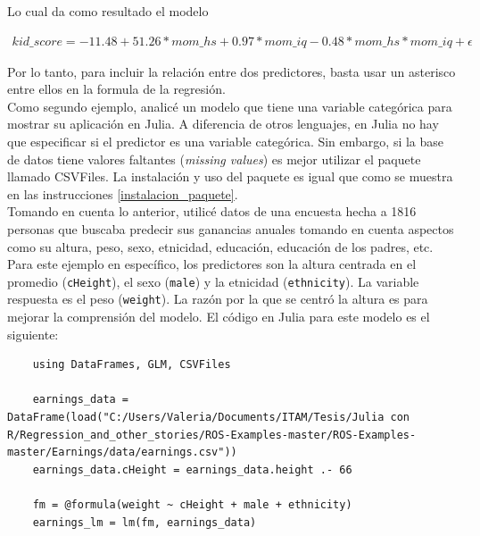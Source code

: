 Lo cual da como resultado el modelo 


\begin{equation*}
    \begin{aligned}
        kid\_score = -11.48 + 51.26* mom\_hs + 0.97*mom\_iq -0.48*mom\_hs*mom\_iq + \epsilon
    \end{aligned}
\end{equation*}

Por lo tanto, para incluir la relación entre dos predictores, basta usar un asterisco entre ellos en la formula de la regresión. 
\\
Como segundo ejemplo, analicé un modelo que tiene una variable categórica para mostrar su aplicación en Julia. A diferencia de otros lenguajes, en Julia no hay que especificar si el predictor es una variable categórica. Sin embargo, si la base de datos tiene valores faltantes (\textit{missing values}) es mejor utilizar el paquete llamado \textsf{CSVFiles}. La instalación y uso del paquete es igual que como se muestra en las instrucciones \ref{instalacion_paquete}.  
\\
Tomando en cuenta lo anterior, utilicé datos de una encuesta hecha a 1816 personas que buscaba predecir sus ganancias anuales tomando en cuenta aspectos como su altura, peso, sexo, etnicidad, educación, educación de los padres, etc. Para este ejemplo en específico, los predictores son la altura centrada en el promedio (\texttt{cHeight}), el sexo (\texttt{male}) y la etnicidad (\texttt{ethnicity}). La variable respuesta es el peso (\texttt{weight}). La razón por la que se centró la altura es para mejorar la comprensión del modelo. El código en Julia para este modelo es el siguiente:

\begin{verbatim}
    using DataFrames, GLM, CSVFiles

    earnings_data = DataFrame(load("C:/Users/Valeria/Documents/ITAM/Tesis/Julia con R/Regression_and_other_stories/ROS-Examples-master/ROS-Examples-master/Earnings/data/earnings.csv"))
    earnings_data.cHeight = earnings_data.height .- 66

    fm = @formula(weight ~ cHeight + male + ethnicity)
    earnings_lm = lm(fm, earnings_data)

\end{verbatim}

